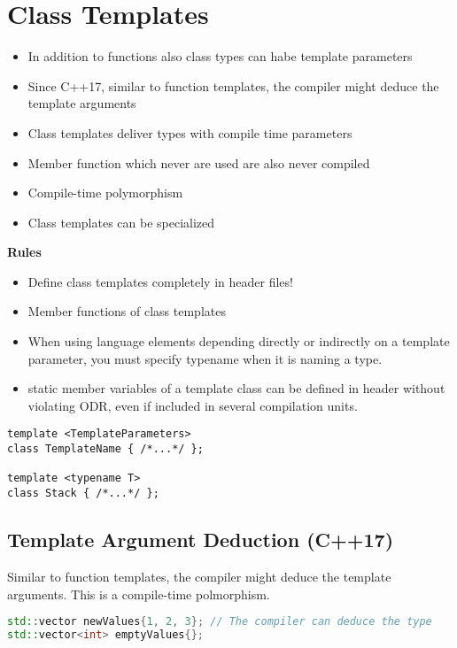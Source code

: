 

\section{Class Templates}

\begin{itemize}
  \itemsep 0em 
  \item In addition to functions also class types can habe template parameters
  \item Since C++17, similar to function templates, the compiler might deduce the template arguments
  \item Class templates deliver types with compile time parameters
  \item Member function which never are used are also never compiled
  \item Compile-time polymorphism
  \item Class templates can be specialized
\end{itemize}

\textbf{Rules}
\begin{itemize}
  \itemsep 0em 
  \item Define class templates completely in header files!
  \item Member functions of class templates
  \item When using language elements depending directly or indirectly on a template parameter, you must specify typename when it is naming a type.
  \item static member variables of a template class can be defined in header without violating ODR, even if included in several compilation units.
\end{itemize}

\begin{lstlisting}
template <TemplateParameters>
class TemplateName { /*...*/ };

template <typename T>
class Stack { /*...*/ };
\end{lstlisting}

\subsection{Template Argument Deduction (C++17)}
Similar to function templates, the compiler might deduce the template arguments. This is a compile-time polmorphism.
\begin{lstlisting}[language=C++]
std::vector newValues{1, 2, 3}; // The compiler can deduce the type 
std::vector<int> emptyValues{}; 
\end{lstlisting}


